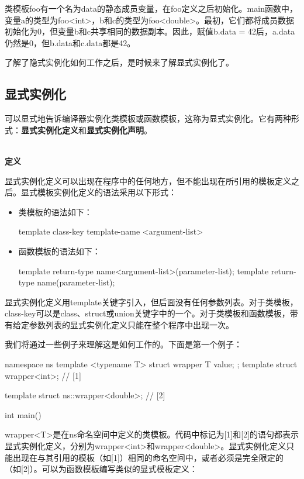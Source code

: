 类模板foo有一个名为data的静态成员变量，在foo定义之后初始化。main函数中，变量a的类型为foo<int>，b和c的类型为foo<double>。最初，它们都将成员数据初始化为0，但变量b和c共享相同的数据副本。因此，赋值b.data = 42后，a.data仍然是0，但b.data和c.data都是42。

了解了隐式实例化如何工作之后，是时候来了解显式实例化了。

\subsection{显式实例化}

可以显式地告诉编译器实例化类模板或函数模板，这称为显式实例化。它有两种形式：\textbf{显式实例化定义}和\textbf{显式实例化声明}。


\hspace*{\fill} \\ %
\noindent\textbf{定义}

显式实例化定义可以出现在程序中的任何地方，但不能出现在所引用的模板定义之后。显式模板实例化定义的语法采用以下形式：

\begin{itemize}
  \item 类模板的语法如下：
\begin{cpp}
template class-key template-name <argument-list>
\end{cpp}
  \item 函数模板的语法如下：
\begin{cpp}
template return-type name<argument-list>(parameter-list);
template return-type name(parameter-list);
\end{cpp}
\end{itemize}

显式实例化定义用template关键字引入，但后面没有任何参数列表。对于类模板，class-key可以是class、struct或union关键字中的一个。对于类模板和函数模板，带有给定参数列表的显式实例化定义只能在整个程序中出现一次。

我们将通过一些例子来理解这是如何工作的。下面是第一个例子：

\begin{cpp}
namespace ns
{
	template <typename T>
	struct wrapper
	{
		T value;
	};
	template struct wrapper<int>; // [1]
}

template struct ns::wrapper<double>; // [2]

int main() {}
\end{cpp}

wrapper<T>是在ns命名空间中定义的类模板。代码中标记为[1]和[2]的语句都表示显式实例化定义，分别为wrapper<int>和wrapper<double>。显式实例化定义只能出现在与其引用的模板（如[1]）相同的命名空间中，或者必须是完全限定的（如[2]）。可以为函数模板编写类似的显式模板定义：

